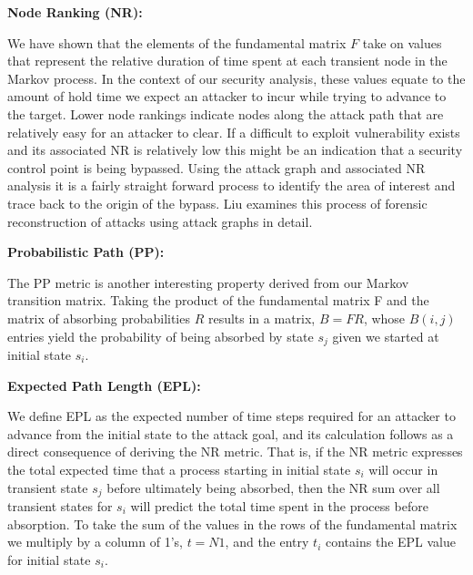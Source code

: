 




\textbf{Node Ranking (NR):  }

We have shown that the elements of the fundamental matrix \(F\) take on values that represent the relative duration of time spent at each transient node in the Markov process. In the context of our security analysis, these values equate to the amount of hold time we expect an attacker to incur while trying to advance to the target. Lower node rankings indicate nodes along the attack path that are relatively easy for an attacker to clear. If a difficult to exploit vulnerability exists and its associated NR is relatively low this might be an indication that a security control point is being bypassed. Using the attack graph and associated NR analysis it is a fairly straight forward process to identify the area of interest and trace back to the origin of the bypass. Liu\cite{Liu_Singhal_Wijesekera} examines this process of forensic reconstruction of attacks using attack graphs in detail.

\textbf{Probabilistic Path (PP):} 

The PP metric is another interesting property derived from our Markov transition matrix. Taking the product of the fundamental matrix F and the matrix of absorbing probabilities \(R\) results in a matrix, \(B = FR\), whose \(B(i,j) \) entries yield the probability of being absorbed by state \(s_j\) given we started at initial state \(s_i\).  

\textbf{Expected Path Length (EPL):  }

We define EPL as the expected number of time steps required for an attacker to advance from the initial state to the attack goal, and its calculation follows as a direct consequence of deriving the NR metric. That is, if the NR metric expresses the total expected time that a process starting in initial state $s_i$ will occur in transient state \(s_j\) before ultimately being absorbed, then the NR sum over all transient states for \(s_i\) will predict the total time spent in the process before absorption. To take the sum of the values in the rows of the fundamental matrix we multiply by a column of 1’s, $t = N1$, and the entry \(t_i\) contains the EPL value for initial state \(s_i\). 
 

